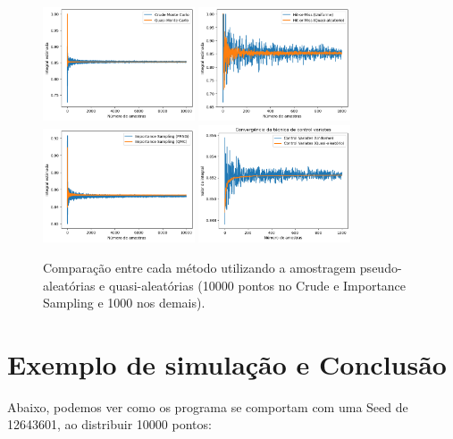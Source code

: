 \documentclass[a4paper]{article}
\begin{document}
\begin{figure}[H]

  \centering
  \includegraphics[width=0.4\textwidth]{Crude.png}
  \includegraphics[width=0.4\textwidth]{HM.png}
  \includegraphics[width=0.4\textwidth]{IS.png}
  \includegraphics[width=0.4\textwidth]{CV.png}
  \caption{Comparação entre cada método utilizando a amostragem pseudo-aleatórias e quasi-aleatórias (10000 pontos no Crude e Importance Sampling e 1000 nos demais).}
\end{figure}

\section{Exemplo de simulação e Conclusão}
Abaixo, podemos ver como os programa se comportam com uma Seed de 12643601, ao distribuir 10000 pontos:
\end{document}
